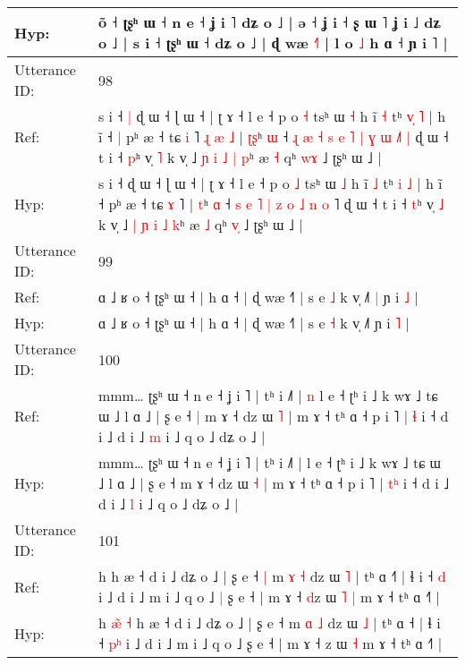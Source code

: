 \documentclass[10pt]{article}
\DeclareRobustCommand{\hl}[1]{{\textcolor{red}{#1}}}
\begin{document}
\begin{longtable}{ll}
 \\
Hyp: & õ ˧ ʈʂʰ ɯ ˧ n e ˧ ʝ i ˥ dʑ o ˩ | ə ˧ ʝ i ˧ ʂ ɯ ˥ ʝ i ˩ dʑ o ˩ | s i ˧ ʈʂʰ ɯ ˧ dʑ o ˩ | ɖ wæ \hl{˧}˥ | l o \hl{˩} h ɑ ˧ ɲ i ˥ |
 \\
\midrule
Utterance ID: & 98 \\
Ref: & s i ˧\hl{ }\hl{|} ɖ ɯ ˧ ɭ ɯ ˧ | ʈ ɤ ˧ l e ˧ p o \hl{˧} tsʰ ɯ \hl{˧} h ĩ \hl{˧} tʰ \hl{v}\hl{̩} \hl{˥} | h ĩ ˧\hl{ }\hl{|} pʰ æ ˧ tɕ \hl{i} ˥\hl{ }\hl{ɻ}\hl{ }\hl{æ}\hl{ }\hl{˩} | \hl{ʈ}\hl{ʂ}ʰ \hl{ɯ} ˧ \hl{ɻ} \hl{æ} \hl{˧} \hl{s} \hl{e} \hl{˥} \hl{|} \hl{ɣ} \hl{ɯ} \hl{˩}˥\hl{ }\hl{|} ɖ ɯ ˧ t i ˧ \hl{p}ʰ v̩ \hl{˥} k v̩ ˩ \hl{ɲ} \hl{i} \hl{˩} \hl{|} \hl{p}ʰ æ \hl{˧} qʰ \hl{w}\hl{ɤ} ˩ ʈʂʰ ɯ ˩ |
 \\
Hyp: & s i ˧\hl{}\hl{} ɖ ɯ ˧ ɭ ɯ ˧ | ʈ ɤ ˧ l e ˧ p o \hl{˩} tsʰ ɯ \hl{˩} h ĩ \hl{˩} tʰ \hl{}\hl{i} \hl{˩} | h ĩ ˧\hl{}\hl{} pʰ æ ˧ tɕ \hl{ɤ} ˥\hl{}\hl{}\hl{}\hl{}\hl{}\hl{} | \hl{}\hl{t}ʰ \hl{ɑ} ˧ \hl{s} \hl{e} \hl{˥} \hl{|} \hl{z} \hl{o} \hl{˩} \hl{n} \hl{o} \hl{}˥\hl{}\hl{} ɖ ɯ ˧ t i ˧ \hl{t}ʰ v̩ \hl{˩} k v̩ ˩ \hl{|} \hl{ɲ} \hl{i} \hl{˩} \hl{k}ʰ æ \hl{˩} qʰ \hl{v}\hl{̩} ˩ ʈʂʰ ɯ ˩ |
 \\
\midrule
Utterance ID: & 99 \\
Ref: & ɑ ˩ ʁ o ˧ ʈʂʰ ɯ ˧ | h ɑ ˧ | ɖ wæ ˧˥ | s e \hl{˩} k v̩ ˩˥\hl{ }\hl{|} ɲ i \hl{˩} |
 \\
Hyp: & ɑ ˩ ʁ o ˧ ʈʂʰ ɯ ˧ | h ɑ ˧ | ɖ wæ ˧˥ | s e \hl{˧} k v̩ ˩˥\hl{}\hl{} ɲ i \hl{˥} |
 \\
\midrule
Utterance ID: & 100 \\
Ref: & mmm… ʈʂʰ ɯ ˧ n e ˧ ʝ i ˥ | tʰ i ˩˥ |\hl{ }\hl{n} l e ˧ ʈʰ i ˩ k wɤ ˩ tɕ ɯ ˩ l ɑ ˩ | ʂ e ˧\hl{ }\hl{|} m ɤ ˧ dz ɯ \hl{˥} | m ɤ ˧ tʰ ɑ ˧ p i ˥ | \hl{}\hl{ɬ} i ˧ d i ˩ d i ˩ \hl{m} i ˩ q o ˩ dʑ o ˩ |
 \\
Hyp: & mmm… ʈʂʰ ɯ ˧ n e ˧ ʝ i ˥ | tʰ i ˩˥ |\hl{}\hl{} l e ˧ ʈʰ i ˩ k wɤ ˩ tɕ ɯ ˩ l ɑ ˩ | ʂ e ˧\hl{}\hl{} m ɤ ˧ dz ɯ \hl{˧} | m ɤ ˧ tʰ ɑ ˧ p i ˥ | \hl{t}\hl{ʰ} i ˧ d i ˩ d i ˩ \hl{l} i ˩ q o ˩ dʑ o ˩ |
 \\
\midrule
Utterance ID: & 101 \\
Ref: & h\hl{}\hl{}\hl{}\hl{}\hl{} h æ ˧ d i ˩ dʑ o ˩ | ʂ e ˧\hl{ }\hl{|} m \hl{ɤ} \hl{˧} dz ɯ \hl{˥} | tʰ ɑ ˧\hl{˥} | ɬ i ˧ \hl{}\hl{d} i ˩ d i ˩ m i ˩ q o ˩\hl{ }\hl{|} ʂ e ˧ | m ɤ ˧ \hl{d}z ɯ\hl{ }\hl{˥} \hl{|} m ɤ ˧ tʰ ɑ ˧˥ |
 \\
Hyp: & h\hl{ }\hl{æ}\hl{̃}\hl{ }\hl{˧} h æ ˧ d i ˩ dʑ o ˩ | ʂ e ˧\hl{}\hl{} m \hl{ɑ} \hl{˩} dz ɯ \hl{˩} | tʰ ɑ ˧\hl{} | ɬ i ˧ \hl{p}\hl{ʰ} i ˩ d i ˩ m i ˩ q o ˩\hl{}\hl{} ʂ e ˧ | m ɤ ˧ \hl{}z ɯ\hl{}\hl{} \hl{˧} m ɤ ˧ tʰ ɑ ˧˥ |

\end{longtable}
\end{document}
